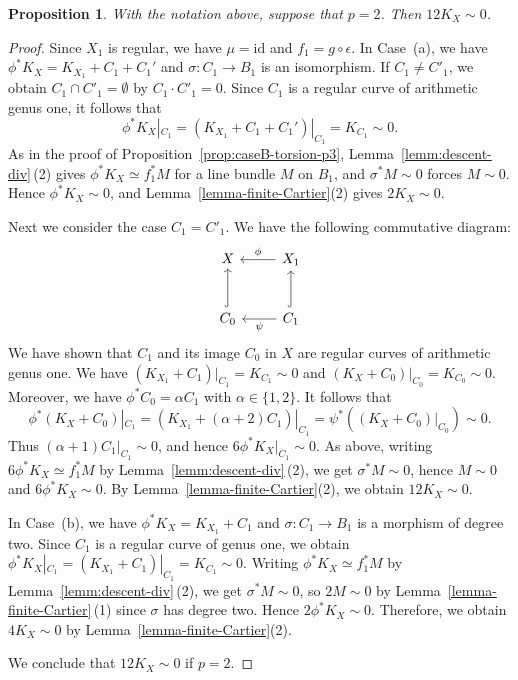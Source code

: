 \documentclass[10pt,abstract=true]{scrartcl}
\numberwithin{equation}{section}
\newtheorem{proposition}[theorem]{Proposition}
\theoremstyle{definition}
\theoremstyle{remark}
\begin{document}
\begin{proposition}\label{prop:caseB-torsion-p2}
  With the notation above, suppose that $p=2$.
  Then $12K_X\sim0$.
\end{proposition}
\begin{proof}
  Since $X_1$ is regular, we have $\mu=\mathrm{id}$ and $f_1=g\circ\epsilon$.
	In Case~(a), we have $\phi^*K_X=K_{X_1}+C_1+C_1'$ and $\sigma\colon C_1\to B_1$ is an isomorphism.
	If $C_1\neq C'_1$, we obtain $C_1\cap C'_1=\emptyset$ by $C_1\cdot C'_1=0$. Since $C_1$ is a regular curve of arithmetic genus one, it follows that
	\[
	\phi^*K_X|_{C_1}
	=(K_{X_1}+C_1+C_1')|_{C_1}=K_{C_1}\sim0.
	\]
	As in the proof of Proposition~\ref{prop:caseB-torsion-p3}, Lemma~\ref{lemm:descent-div}\,\textup{(2)} gives $\phi^*K_X\simeq f_1^*M$ for a line bundle $M$ on $B_1$, and $\sigma^*M\sim0$ forces $M\sim0$.
	Hence $\phi^*K_X\sim0$, and Lemma~\ref{lemma-finite-Cartier}(2) gives $2K_X\sim0$.
	
	Next we consider the case $C_1= C'_1$. 
	We have the following commutative diagram:
	\begin{equation*}
		\begin{tikzcd}[row sep=normal]
			X & X_1 \ar[l,"\phi"'] \\[2ex]
			C_0\ar[u,hook]&C_1\ar[u,hook]\ar[l,"\psi"]
		\end{tikzcd}
	\end{equation*}	
	We have shown that $C_1$ and its image $C_0$ in $X$ are regular curves of arithmetic genus one. We have
	$(K_{X_1}+C_1)|_{C_1}=K_{C_1}\sim0$ and $(K_X+C_0)|_{C_0}=K_{C_0}\sim0.$
	Moreover, we have $\phi^*C_0=\alpha C_1$ with $\alpha\in\{1,2\}$.
	It follows that \[
		\phi^*(K_X+C_0)|_{C_1}=(K_{X_1}+(\alpha+2)C_1)|_{C_1}=\psi^*((K_X+C_0)|_{C_0})\sim 0. 
    \]
	Thus $(\alpha+1)C_1|_{C_1}\sim0$, and hence
	$6\phi^*K_X|_{C_1}\sim0$. 
	As above, writing $6\phi^*K_X\simeq f_1^*M$ by Lemma~\ref{lemm:descent-div}\,\textup{(2)}, we get $\sigma^*M\sim0$, hence $M\sim0$ and $6\phi^*K_X\sim0$.
	By Lemma~\ref{lemma-finite-Cartier}(2), we obtain $12K_X\sim0$.
	
	In Case~(b), we have $\phi^*K_X=K_{X_1}+C_1$ and $\sigma\colon C_1\to B_1$ is a morphism of degree two. Since $C_1$ is a regular curve of genus one, we obtain $\phi^*K_X|_{C_1}=(K_{X_1}+C_1)|_{C_1}=K_{C_1}\sim0$.
	Writing $\phi^*K_X\simeq f_1^*M$ by Lemma~\ref{lemm:descent-div}\,\textup{(2)}, we get $\sigma^*M\sim0$, so $2M\sim0$ by Lemma~\ref{lemma-finite-Cartier}\,\textup{(1)} since $\sigma$ has degree two.
	Hence $2\phi^*K_X\sim0$.
	Therefore, we obtain $4K_X\sim0$ by Lemma~\ref{lemma-finite-Cartier}(2).

	
    We conclude that $12K_X\sim0$ if $p=2$.
\end{proof}
\end{document}
